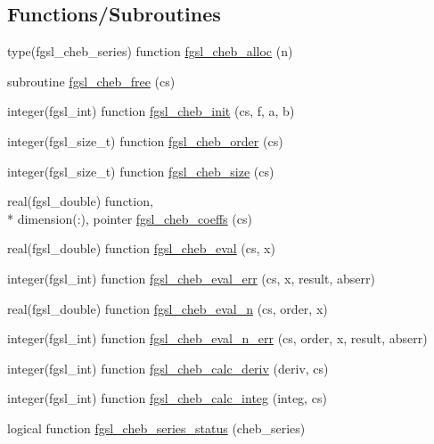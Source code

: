\subsection*{Functions/\-Subroutines}
\begin{DoxyCompactItemize}
\item 
type(fgsl\-\_\-cheb\-\_\-series) function \hyperlink{chebyshev_8finc_a18d26925af2b33815928669f2d20c5fc}{fgsl\-\_\-cheb\-\_\-alloc} (n)
\item 
subroutine \hyperlink{chebyshev_8finc_a90dec86100b0f31a78ba02588fcb32fa}{fgsl\-\_\-cheb\-\_\-free} (cs)
\item 
integer(fgsl\-\_\-int) function \hyperlink{chebyshev_8finc_ab5144a511c4795aaa1aef381fba746fe}{fgsl\-\_\-cheb\-\_\-init} (cs, f, a, b)
\item 
integer(fgsl\-\_\-size\-\_\-t) function \hyperlink{chebyshev_8finc_a5779d00f29d0a47bdaca96cfac314d45}{fgsl\-\_\-cheb\-\_\-order} (cs)
\item 
integer(fgsl\-\_\-size\-\_\-t) function \hyperlink{chebyshev_8finc_a27d005e888c9e5c333f506c443f4a685}{fgsl\-\_\-cheb\-\_\-size} (cs)
\item 
real(fgsl\-\_\-double) function, \\*
dimension(\-:), pointer \hyperlink{chebyshev_8finc_a2316b05113eaf931af64fdc1d1a9cb34}{fgsl\-\_\-cheb\-\_\-coeffs} (cs)
\item 
real(fgsl\-\_\-double) function \hyperlink{chebyshev_8finc_a96a78f419947fd9bbf6807b72ebbb54e}{fgsl\-\_\-cheb\-\_\-eval} (cs, x)
\item 
integer(fgsl\-\_\-int) function \hyperlink{chebyshev_8finc_a0d44ec8fe2a70ec2aaaef7cfd8162d29}{fgsl\-\_\-cheb\-\_\-eval\-\_\-err} (cs, x, result, abserr)
\item 
real(fgsl\-\_\-double) function \hyperlink{chebyshev_8finc_ae34a6bce879de1fe39156fc359b1284d}{fgsl\-\_\-cheb\-\_\-eval\-\_\-n} (cs, order, x)
\item 
integer(fgsl\-\_\-int) function \hyperlink{chebyshev_8finc_a658cd8743b6ea29f95e45b09d1a4a33b}{fgsl\-\_\-cheb\-\_\-eval\-\_\-n\-\_\-err} (cs, order, x, result, abserr)
\item 
integer(fgsl\-\_\-int) function \hyperlink{chebyshev_8finc_afca0a21ed23434831b8e29d9d1f414f9}{fgsl\-\_\-cheb\-\_\-calc\-\_\-deriv} (deriv, cs)
\item 
integer(fgsl\-\_\-int) function \hyperlink{chebyshev_8finc_aed9d097bbf1263e532133c421b844d0a}{fgsl\-\_\-cheb\-\_\-calc\-\_\-integ} (integ, cs)
\item 
logical function \hyperlink{chebyshev_8finc_a757025ca75214fce2a6b57688ffa61b7}{fgsl\-\_\-cheb\-\_\-series\-\_\-status} (cheb\-\_\-series)
\end{DoxyCompactItemize}


